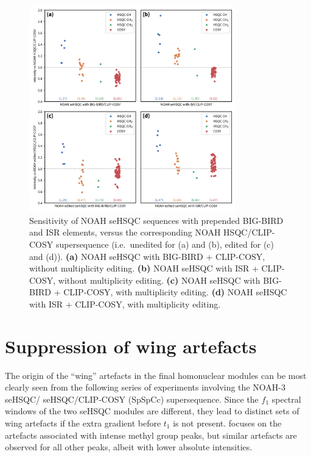 \begin{figure}
    \centering
    \includegraphics[width=0.8\textwidth]{./figures/bigbird.png}
    \caption{
        Sensitivity of NOAH seHSQC sequences with prepended BIG-BIRD and ISR elements, versus the corresponding NOAH HSQC/CLIP-COSY supersequence (i.e.\ unedited for (a) and (b), edited for (c) and (d)).
        \andro{}
        \textbf{(a)} NOAH seHSQC with BIG-BIRD + CLIP-COSY, without multiplicity editing.
        \textbf{(b)} NOAH seHSQC with ISR + CLIP-COSY, without multiplicity editing.
        \textbf{(c)} NOAH seHSQC with BIG-BIRD + CLIP-COSY, with multiplicity editing.
        \textbf{(d)} NOAH seHSQC with ISR + CLIP-COSY, with multiplicity editing.
    }
    \label{fig:bigbird}
\end{figure}


\section{Suppression of wing artefacts}

The origin of the ``wing'' artefacts in the final homonuclear modules can be most clearly seen from the following series of experiments involving the NOAH-3 \nitrogen{} seHSQC/\carbon{} seHSQC/CLIP-COSY (SpSpCc) supersequence.
Since the $f_1$ spectral windows of the two seHSQC modules are different, they lead to distinct sets of wing artefacts if the extra gradient before $t_1$ is not present.
 focuses on the artefacts associated with intense methyl group peaks, but similar artefacts are observed for all other peaks, albeit with lower absolute intensities.

